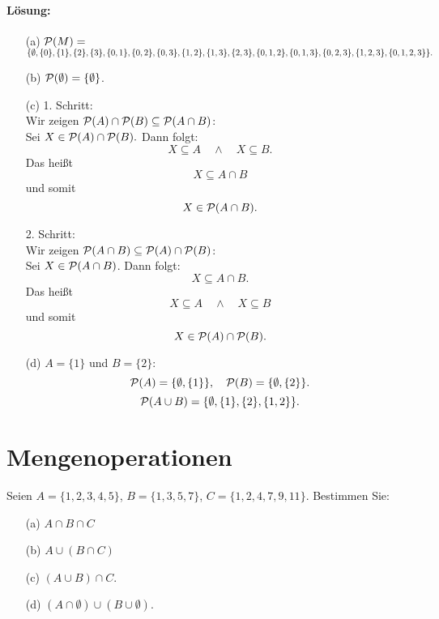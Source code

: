 \documentclass[
				a4paper,
				10pt
			]
			{scrartcl}
\begin{document}
\paragraph{L\"osung:}
\begin{itemize}
	\item[(a)] ${\cal P}(M) = $\\
			$\{ \emptyset,\\ 
				\{0\}, \{1\}, \{2\}, \{3\},\\ 
				\{0,1\}, \{0,2\}, \{0,3\}, \{1,2\}, \{1,3\}, \{2,3\},\\ 
				\{0,1,2\}, \{0,1,3\}, \{0,2,3\}, \{1,2,3\},\\ 
				\{0,1,2,3\}  \}.$
	\item[(b)] ${\cal P}(\emptyset) = \{ \emptyset \}$.
	\item[(c)] 1. Schritt:\\ 
			Wir zeigen ${\cal P}(A) \cap {\cal P}(B) \subseteq  {\cal P}(A\cap B)$:\\
			Sei $X \in {\cal P}(A) \cap {\cal P}(B).$ Dann folgt:
			$$
				X \subseteq A\quad \land \quad X \subseteq B.
			$$
			Das hei{\ss}t
			$$
				X \subseteq A \cap B
			$$
			und somit
			$$
				X \in  {\cal P}(A\cap B).
			$$
			
			2. Schritt:\\
			Wir zeigen $ {\cal P}(A\cap B) \subseteq  {\cal P}(A) \cap {\cal P}(B) $:\\
			Sei $X \in {\cal P}(A\cap B)$. Dann folgt:
			$$
				X \subseteq A\cap B.
			$$
			Das hei{\ss}t
			$$
				X \subseteq A \quad \land \quad X \subseteq B
			$$
			und somit
			$$
				X \in {\cal P}(A) \cap {\cal P}(B).
			$$
			
	\item[(d)] $A=\{1\}$ und $B=\{2\}$: 
			$$
				{\cal P}(A) = \{\emptyset, \{1\} \}, \quad {\cal P}(B) = \{\emptyset, \{2\} \}.
			$$
			$$
				{\cal P}(A\cup B) = \{\emptyset, \{1\}, \{2\}, \{1,2\} \}.
			$$
\end{itemize}

\section{Mengenoperationen}

Seien $A = \{1,2,3,4,5 \}$, $B=\{1,3,5,7\}$, $C= \{ 1,2,4,7,9,11\}$. Bestimmen Sie:
\begin{itemize}
	\item[(a)] $A\cap B \cap C$
	\item[(b)] $A\cup( B\cap C)$
	\item[(c)] $(A\cup B) \cap C$.
	\item[(d)] $(A\cap \emptyset) \cup (B \cup \emptyset)$.
\end{itemize}
\end{document}

